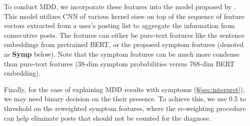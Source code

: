 To conduct MDD, we incorporate these features into the model proposed by \citet{nguyen2022improving}. This model utilizes CNN of various kernel sizes on top of the sequence of feature vectors extracted from a user's posting list to aggregate the information from consecutive posts. The features can either be pure-text features like the sentence embeddings from pretrained BERT, or the proposed symptom features (denoted as \textbf{Symp} below). Note that the symptom features can be much more condense than pure-text features (38-dim symptom probabilities versus 768-dim BERT embedding).

Finally, for the ease of explaining MDD results with symptoms (\S \ref{sec:interpret}), we may need binary decision on the their presence. To achieve this, we use 0.5 to threshold on the reweighted symptom features, where the re-weighting procedure can help eliminate posts that should not be counted for the diagnose. 
